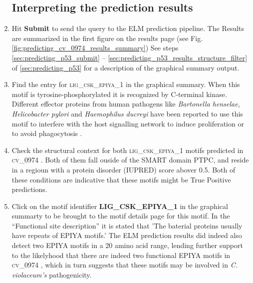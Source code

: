 \documentclass[12pt]{article}
\newcommand\button[1]{%
	\textbf{#1}%
}
\newcommand\motif[1]{%
    \textsc{\lowercase{#1}}%
}
\newcommand\uniprot[1]{%
	\textsc{\lowercase{#1}}%
}
\begin{document}
\begin{enumerate}
%
%

\subsection*{Interpreting the prediction results}
\label{sec:predicting_cv_0974_graphical_summary}

\item Hit \button{Submit} to send the query to the ELM prediction pipeline.
    The Results are summarized in the first figure on the results page
	(see Fig. \ref{fig:predicting_cv_0974_results_summary})
    See steps \ref{sec:predicting_p53_submit} -- \ref{sec:predicting_p53_results_structure_filter} 
    of \ref{sec:predicting_p53} for a description of the
    graphical summary output.

\item Find the entry for \motif{LIG\_CSK\_EPIYA\_1} in the graphical summary.
    When this motif is tyrosine-phosphorylated it is recognized by C-terminal
    kinase. Different effector proteins from human pathogens like
    \textit{Bartonella henselae}, \textit{Helicobacter pylori} and
    \textit{Haemophilus ducreyi} have been reported to use this motif to
    interfere with the host signalling network to induce proliferation or to
    avoid phagocytosis \citep{19380118, 12446738, 24902122}.

\item Check the structural context for both \motif{LIG\_CSK\_EPIYA\_1} motifs
    predicted in \uniprot{CV\_0974}. Both of them fall ouside of the SMART
    domain PTPC, and reside in a regioun with a protein disorder (IUPRED) score
    abover 0.5. Both of these conditions are indicative that these motifs might
    be True Positive predictions.


\item Click on the motif identifier \button{LIG\_CSK\_EPIYA\_1} in the
        graphical summarty to be brought to the motif details page for this
        motif. In the ``Functional site description'' it is stated that 'The
        baterial proteins usually have repeats of EPIYA motifs.' The ELM
        prediction results did indeed also detect two EPIYA motifs in a 20
        amino acid range, lending further support to the likelyhood that there
        are indeed two functional EPIYA motifs in \uniprot{CV\_0974}, which in
        turn suggests that these motifs may be involved in \textit{C.
        violaceum's} pathogenicity.

\end{enumerate}
\end{document}
